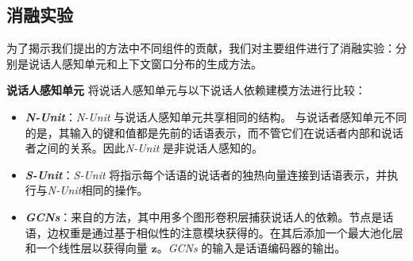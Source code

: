 \begin{table}[!ht]
\centering
\caption{主要结果。最好的 F1 分数以粗体突出显示。 - 表示未报告的结果。 CSK是commonsense knowledge（常识知识）的缩写。 $\star$ 表示实验中得到的结果。}
\label{tab:F1}
\small
{}
\end{table}

\subsection{消融实验}\label{sec:ablation}
为了揭示我们提出的方法中不同组件的贡献，我们对主要组件进行了消融实验：分别是说话人感知单元和上下文窗口分布的生成方法。

\noindent\textbf{说话人感知单元 } 将说话人感知单元与以下说话人依赖建模方法进行比较：
\begin{itemize}
    \item \textit{\textbf{N-Unit}}：\textit{N-Unit} 与说话人感知单元共享相同的结构。 与说话者感知单元不同的是，其输入的键和值都是先前的话语表示，而不管它们在说话者内部和说话者之间的关系。因此\textit{N-Unit} 是非说话人感知的。
    \item \textit{\textbf{S-Unit}}：\textit{S-Unit} 将指示每个话语的说话者的独热向量连接到话语表示，并执行与\textit{N-Unit}相同的操作。
    \item \textit{\textbf{GCNs}}：来自\citet{ghosal2019dialoguegcn}的方法，其中用多个图形卷积层捕获说话人的依赖。节点是话语，边权重是通过基于相似性的注意模块获得的。在其后添加一个最大池化层和一个线性层以获得向量 $\mathbf{z}$。\textit{GCNs} 的输入是话语编码器的输出。
\end{itemize}

